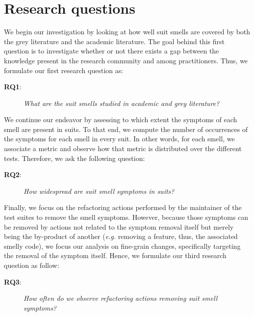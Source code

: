 \section{Research questions}


We begin our investigation by looking at how well \gls{suit} smells are covered by both the grey literature and the academic literature. The goal behind this first question is to investigate whether or not there exists a gap between the knowledge present in the research community and among practitioners. Thus, we formulate our first research question as:

\begin{description} 
\item[\textbf{RQ1}:]
\emph{What are the \gls{suit} smells studied in academic and grey literature?} 
\end{description} 

We continue our endeavor by assessing to which extent the symptoms of each smell are present in \gls{suit}s. To that end, we compute the number of occurrences of the symptoms for each smell in every \gls{suit}. In other words, for each smell, we associate a metric and observe how that metric is distributed over the different tests. Therefore, we ask the following question:

\begin{description} 
\item[\textbf{RQ2}:]
\emph{How widespread are \gls{suit} smell symptoms in \gls{suit}s?} 
\end{description} 

Finally, we focus on the refactoring actions performed by the maintainer of the test suites to remove the smell symptoms. However, because those symptoms can be removed by actions not related to the symptom removal itself but merely being the by-product of another (\emph{e.g.} removing a feature, thus, the associated smelly code), we focus our analysis on fine-grain changes, specifically targeting the removal of the symptom itself. Hence, we formulate our third research question as follow:

\begin{description} 
\item[\textbf{RQ3}:]
\emph{How often do we observe refactoring actions removing \gls{suit} smell symptoms?} 
\end{description} 